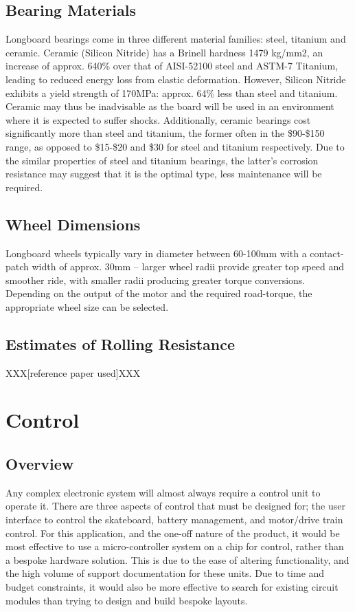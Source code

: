 \documentclass[journal,10pt]{IEEEtran}
\begin{document}
    \subsection{Bearing Materials}
        Longboard bearings come in three different material families: steel, titanium and ceramic. Ceramic (Silicon Nitride) has a Brinell hardness 1479 kg/mm2, an increase of approx. 640\% over that of AISI-52100 steel and ASTM-7 Titanium, leading to reduced energy loss from elastic deformation. However, Silicon Nitride exhibits a yield strength of 170MPa: approx. 64\% less than steel and titanium. Ceramic may thus be inadvisable as the board will be used in an environment where it is expected to suffer shocks. Additionally, ceramic bearings cost significantly more than steel and titanium, the former often in the \$90-\$150 range, as opposed to \$15-\$20 and \$30 for steel and titanium respectively. Due to the similar properties of steel and titanium bearings, the latter’s corrosion resistance may suggest that it is the optimal type, less maintenance will be required. 
    \subsection{Wheel Dimensions}
        Longboard wheels typically vary in diameter between 60-100mm with a contact-patch width of approx. 30mm – larger wheel radii provide greater top speed and smoother ride, with smaller radii producing greater torque conversions. Depending on the output of the motor and the required road-torque, the appropriate wheel size can be selected.
    \subsection{Estimates of Rolling Resistance}
        \begin{figure}[H]
            \centering
            \caption{}
            \label{fig:Rolling Resistance Diagram}
        \end{figure}
    
    XXX[reference paper used]XXX
    
\section{Control}
    \subsection{Overview}
    	Any complex electronic system will almost always require a control unit to operate it.
    	There are three aspects of control that must be designed for; the user interface to control the skateboard, battery management, and motor/drive train control.
    	For this application, and the one-off nature of the product, it would be most effective to use a micro-controller system on a chip for control, rather than a bespoke hardware solution.
    	This is due to the ease of altering functionality, and the high volume of support documentation for these units.
    	Due to time and budget constraints, it would also be more effective to search for existing circuit modules than trying to design and build bespoke layouts.
\end{document}
